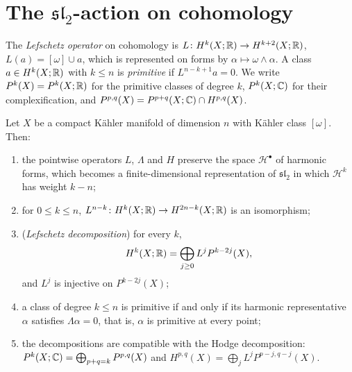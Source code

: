 \section{The $\mathfrak{sl}_2$-action on cohomology}\label{lefschetz-theorems:section-sl2-cohomology}

\begin{definition}\label{lefschetz-theorems:definition-lefschetz-cohomology}
The \emph{Lefschetz operator} on cohomology is $L \colon H^k(X; \mathbb{R}) \to H^{k+2}(X; \mathbb{R})$, $L(a) = [\omega] \cup a$, which is
represented on forms by $\alpha \mapsto \omega \wedge \alpha$. A class $a \in H^k(X; \mathbb{R})$ with $k \leq n$ is \emph{primitive} if
$L^{n-k+1}a = 0$. We write $P^k(X) = P^k(X; \mathbb{R})$ for the primitive classes of degree $k$, $P^k(X; \mathbb{C})$ for their complexification,
and $P^{p,q}(X) = P^{p+q}(X; \mathbb{C}) \cap H^{p,q}(X)$.
\end{definition}

\begin{theorem}\label{lefschetz-theorems:theorem-hard-lefschetz}
Let $X$ be a compact K\"ahler manifold of dimension $n$ with K\"ahler class $[\omega]$. Then:
\begin{enumerate}
\item the pointwise operators $L$, $\Lambda$ and $H$ preserve the space $\mathcal{H}^\bullet$ of harmonic forms, which becomes a
finite-dimensional representation of $\mathfrak{sl}_2$ in which $\mathcal{H}^k$ has weight $k - n$;
\item for $0 \leq k \leq n$, $L^{n-k} \colon H^k(X; \mathbb{R}) \to H^{2n-k}(X; \mathbb{R})$ is an isomorphism;
\item (\emph{Lefschetz decomposition}) for every $k$,
\[
H^k(X; \mathbb{R}) = \bigoplus_{j \geq 0}L^jP^{k-2j}(X),
\]
and $L^j$ is injective on $P^{k-2j}(X)$;
\item a class of degree $k \leq n$ is primitive if and only if its harmonic representative $\alpha$ satisfies $\Lambda\alpha = 0$, that is,
$\alpha$ is primitive at every point;
\item the decompositions are compatible with the Hodge decomposition:
$P^k(X; \mathbb{C}) = \bigoplus_{p+q=k}P^{p,q}(X)$ and $H^{p,q}(X) = \bigoplus_jL^jP^{p-j,q-j}(X)$.
\end{enumerate}
\end{theorem}

